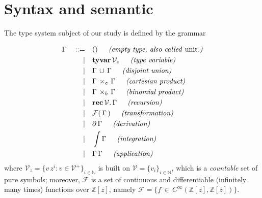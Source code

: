 \section{Syntax and semantic}

The type system subject of our study is defined by the grammar
\begin{definition}[Syntax]
\begin{displaymath}
\begin{split}
\Gamma\quad::=\quad&()\indent\textit{(empty type, also called \emph{unit}.)} \\
             |\quad&\textbf{tyvar}\,\mathcal{V}_{z}\indent\textit{(type variable)} \\
             |\quad&\tydu{\Gamma}{\Gamma}\indent\textit{(disjoint union)} \\
             |\quad&\Gamma\,\times_{c}\,\Gamma\indent\textit{(cartesian product)} \\
             |\quad&\Gamma\,\times_{b}\,\Gamma\indent\textit{(binomial product)} \\
             |\quad&\textbf{rec}\,\mathcal{V}.\,\Gamma\indent\textit{(recursion)} \\
             |\quad&\mathcal{F}(\,\Gamma\,)\indent\textit{(transformation)} \\
             |\quad&\partial\,{\Gamma}\indent\textit{(derivation)} \\
             |\quad&\int{\Gamma}\indent\textit{(integration)} \\
             |\quad&\Gamma\,\Gamma\indent\textit{(application)} \\
\end{split}
\end{displaymath}
where $\mathcal{V}_{z} = \lbrace v\,z^{i}:v\in\mathcal{V}^{+}
\rbrace_{i\in\mathbb{N}}$ is built on $\mathcal{V}=  \lbrace v_{i}
\rbrace_{i\in\mathbb{N}}$, which is a \textit{countable} set of pure symbols;
moreover, $\mathcal{F}$ is a set of continuous and differentiable (infinitely
many times) functions over $\mathbb{Z}[z]$, namely  $\mathcal{F} = \lbrace
f\,\in\,C^{\infty}(\mathbb{Z}[z], \mathbb{Z}[z])\rbrace$.
\end{definition}

